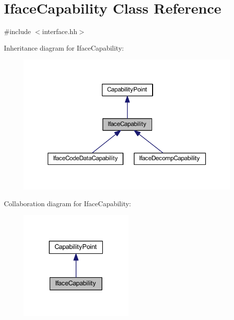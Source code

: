 \hypertarget{class_iface_capability}{}\section{Iface\+Capability Class Reference}
\label{class_iface_capability}


{\ttfamily \#include $<$interface.\+hh$>$}



Inheritance diagram for Iface\+Capability\+:
\nopagebreak
\begin{figure}[H]
\begin{center}
\leavevmode
\includegraphics[width=336pt]{class_iface_capability__inherit__graph}
\end{center}
\end{figure}


Collaboration diagram for Iface\+Capability\+:
\nopagebreak
\begin{figure}[H]
\begin{center}
\leavevmode
\includegraphics[width=162pt]{class_iface_capability__coll__graph}
\end{center}
\end{figure}
